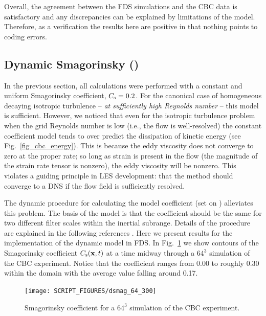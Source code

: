 \documentclass[11pt]{book}
\begin{document}
Overall, the agreement between the FDS simulations and the CBC data is satisfactory and any discrepancies can be explained by limitations of the model.  Therefore, as a verification the results here are positive in that nothing points to coding errors.





\subsection{Dynamic Smagorinsky (\texorpdfstring{}{dsmag})}
\label{dynamic_smagorinsky_model}

In the previous section, all calculations were performed with a constant and uniform Smagorinsky coefficient, $C_{\rm s} = 0.2$.  For the canonical case of homogeneous decaying isotropic turbulence -- \emph{at sufficiently high Reynolds number} -- this model is sufficient.  However, we noticed that even for the isotropic turbulence problem when the grid Reynolds number is low (i.e., the flow is well-resolved) the constant coefficient model tends to over predict the dissipation of kinetic energy (see Fig.~\ref{fig_cbc_energy}).  This is because the eddy viscosity does not converge to zero at the proper rate; so long as strain is present in the flow (the magnitude of the strain rate tensor is nonzero), the eddy viscosity will be nonzero.  This violates a guiding principle in LES development: that the method should converge to a DNS if the flow field is sufficiently resolved.

The dynamic procedure for calculating the model coefficient (set  on ) alleviates this problem.  The basis of the model is that the coefficient should be the same for two different filter scales within the inertial subrange.  Details of the procedure are explained in the following references \cite{Germano:1991,PinoMartin:2000,Moin:1991,Lund:1997,FDS_Math_Guide}.  Here we present results for the implementation of the dynamic model in FDS.  In Fig.~\ref{fig_c_smag} we show contours of the Smagorinsky coefficient $C_{\rm s}(\mathbf{x},t)$ at a time midway through a $64^3$ simulation of the CBC experiment.  Notice that the coefficient ranges from 0.00 to roughly 0.30 within the domain with the average value falling around 0.17.

\begin{figure}[t]
\centering
\texttt{[image: SCRIPT\_FIGURES/dsmag\_64\_300]}
\caption[Dynamic Smagorinsky coefficient]{Smagorinsky coefficient for a $64^3$ simulation of the CBC experiment.}
\label{fig_c_smag}
\end{figure}
\end{document}
